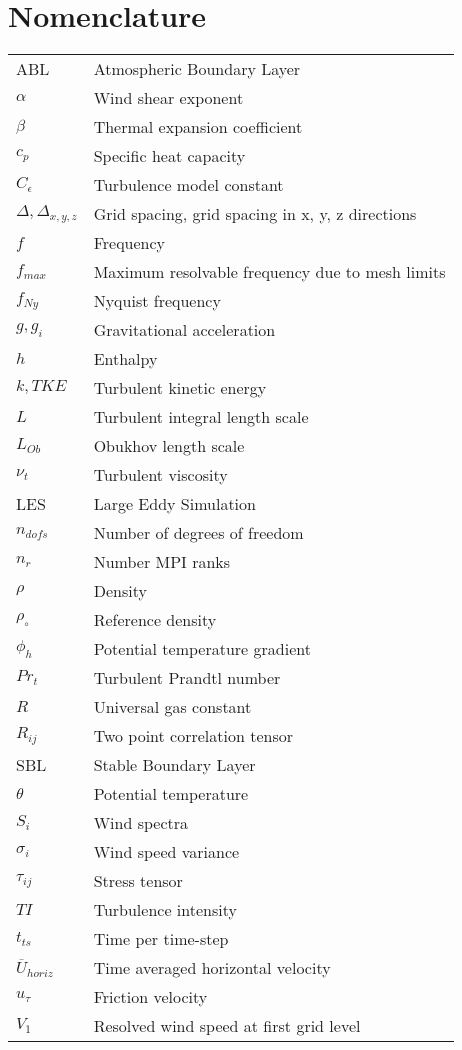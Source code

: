 \documentclass[conf]{new-aiaa}
\begin{document}
\section{Nomenclature}
{\renewcommand\arraystretch{1.0}
  \noindent\begin{longtable*}{@{}l @{\quad=\quad} l@{}}
ABL       & Atmospheric Boundary Layer \\
$\alpha$  & Wind shear exponent  \\
$\beta$   & Thermal expansion coefficient \\
$c_p$     & Specific heat capacity \\
$C_\epsilon$  & Turbulence model constant \\
$\Delta, \Delta_{x,y,z}$  & Grid spacing, grid spacing in x, y, z directions \\
$f$       & Frequency \\
$f_{max}$  & Maximum resolvable frequency due to mesh limits \\
$f_{Ny}$   & Nyquist frequency \\
$g, g_i$   & Gravitational acceleration \\
$h$       & Enthalpy \\
$k, TKE$  & Turbulent kinetic energy \\
$L$       & Turbulent integral length scale \\
$L_{Ob}$   & Obukhov length scale \\
$\nu_t$   & Turbulent viscosity \\
LES       & Large Eddy Simulation \\
$n_{dofs}$ & Number of degrees of freedom \\
$n_r$     & Number MPI ranks \\
$\rho$    & Density \\
$\rho_\circ$ & Reference density  \\
$\phi_h$  & Potential temperature gradient \\
$Pr_t$    & Turbulent Prandtl number \\
$R$       & Universal gas constant \\
$R_{ij}$   & Two point correlation tensor \\
SBL       & Stable Boundary Layer \\
$\theta$  & Potential temperature \\
$S_i$     & Wind spectra \\
$\sigma_i$ & Wind speed variance \\
$\tau_{ij}$ & Stress tensor \\
$TI$      & Turbulence intensity \\
$t_{ts}$  & Time per time-step \\
$\overline{U}_{horiz}$ & Time averaged horizontal velocity \\
$u_\tau$   & Friction velocity    \\
$V_1$     & Resolved wind speed at first grid level
\end{longtable*}}
\end{document}
